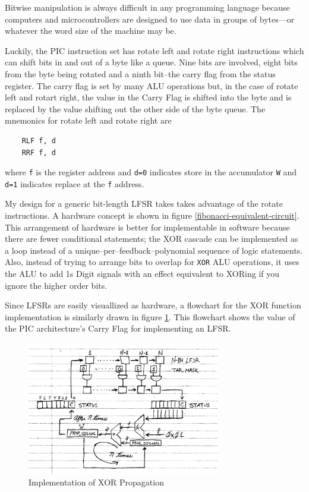 \documentclass[11pt]{article}
\begin{document}
Bitwise manipulation is always difficult in any programming language because
computers and microcontrollers are designed to use data in groups of bytes---or
whatever the word size of the machine may be.

Luckily, the PIC instruction set has rotate left and rotate right instructions
which can shift bits in and out of a byte like a queue. Nine bits are involved,
eight bits from the byte being rotated and a ninth bit--the carry flag from
the status register. The carry flag is set by many ALU operations but, in the case
of rotate left and rotart right, the value in the Carry Flag is shifted into
the byte and is replaced by the value shifting out the other side of the byte queue.
The mnemonics for rotate left and rotate right are
\begin{verbatim}
	RLF	f, d
	RRF	f, d
\end{verbatim}
where \texttt{f} is the register address and \texttt{d=0} indicates store in
the accumulator \texttt{W} and \texttt{d=1} indicates replace at the \texttt{f} address.

My design for a generic bit-length LFSR takes takes advantage of the rotate instructions.
A hardware concept is shown in figure \ref{fibonacci-equivalent-circuit}. This
arrangement of hardware is better for implementable in software because there are fewer
conditional statements; the XOR cascade can be implemented as a loop instead of
a unique--per--feedback--polynomial sequence of logic statements. Also, instead of
trying to arrange bits to overlap for \texttt{XOR} ALU operations, it uses the ALU
to add 1s Digit signals with an effect equivalent to XORing if you ignore the higher order bits.

Since LFSRs are easily visuallized as hardware, a flowchart for the XOR function
implementation is similarly drawn in figure \ref{xor-propagation-flowchart}.
This flowchart shows the value of the PIC architecture's Carry Flag for implementing an LFSR.

\begin{figure}
	\centering
	\includegraphics[width=0.75\textwidth]{Figures/xor-propagation-flowchart.pdf}
	\caption{Implementation of XOR Propagation}
	\label{xor-propagation-flowchart}
\end{figure}
\end{document}
